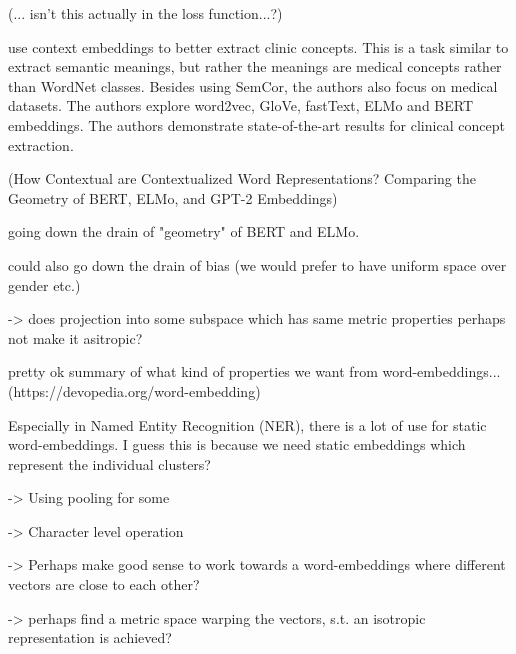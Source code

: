 \documentclass[a4paper,12pt,twoside,openright]{report}
\begin{document}
(... isn't this actually in the loss function...?)

\cite{si19} use context embeddings to better extract clinic concepts. 
This is a task similar to extract semantic meanings, but rather the meanings are medical concepts rather than WordNet classes.
Besides using SemCor, the authors also focus on medical datasets.
The authors explore word2vec, GloVe, fastText, ELMo and BERT embeddings.
The authors demonstrate state-of-the-art results for clinical concept extraction.





\newpage















(How Contextual are Contextualized Word Representations? Comparing the Geometry of BERT, ELMo, and GPT-2 Embeddings)

going down the drain of "geometry" of BERT and ELMo.

could also go down the drain of bias (we would prefer to have uniform space over gender etc.)

-> does projection into some subspace which has same metric properties perhaps not make it asitropic?

pretty ok summary of what kind of properties we want from word-embeddings... (https://devopedia.org/word-embedding)


Especially in Named Entity Recognition (NER), there is a lot of use for static word-embeddings.
I guess this is because we need static embeddings which represent the individual clusters?

-> Using pooling for some 

-> Character level operation

-> Perhaps make good sense to work towards a word-embeddings where different vectors are close to each other?

-> perhaps find a metric space warping the vectors, s.t. an isotropic representation is achieved?
\end{document}

